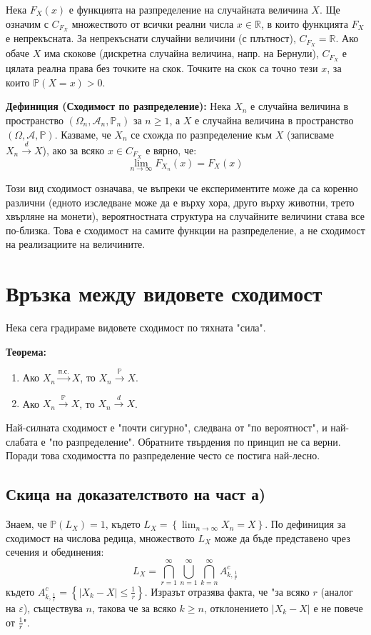\documentclass{article}
\begin{document}
Нека $F_X(x)$ е функцията на разпределение на случайната величина $X$. Ще означим с $C_{F_X}$ множеството от всички реални числа $x \in \mathbb{R}$, в които функцията $F_X$ е непрекъсната. За непрекъснати случайни величини (с плътност), $C_{F_X} = \mathbb{R}$. Ако обаче $X$ има скокове (дискретна случайна величина, напр. на Бернули), $C_{F_X}$ е цялата реална права без точките на скок. Точките на скок са точно тези $x$, за които $\mathbb{P}(X = x) > 0$.

\textbf{Дефиниция (Сходимост по разпределение):} Нека $X_n$ е случайна величина в пространство $(\Omega_n, \mathcal{A}_n, \mathbb{P}_n)$ за $n \ge 1$, а $X$ е случайна величина в пространство $(\Omega, \mathcal{A}, \mathbb{P})$. Казваме, че $X_n$ се схожда по разпределение към $X$ (записваме $X_n \xrightarrow{d} X$), ако за всяко $x \in C_{F_X}$ е вярно, че:
\[
\lim_{n \to \infty} F_{X_n}(x) = F_X(x)
\]

Този вид сходимост означава, че въпреки че експериментите може да са коренно различни (едното изследване може да е върху хора, друго върху животни, трето хвърляне на монети), вероятностната структура на случайните величини става все по-близка. Това е сходимост на самите функции на разпределение, а не сходимост на реализациите на величините.

\section{Връзка между видовете сходимост}

Нека сега градираме видовете сходимост по тяхната "сила".

\textbf{Теорема:}
\begin{enumerate}
    \item[а)] Ако $X_n \xrightarrow{\text{п.с.}} X$, то $X_n \xrightarrow{\mathbb{P}} X$.
    \item[б)] Ако $X_n \xrightarrow{\mathbb{P}} X$, то $X_n \xrightarrow{d} X$.
\end{enumerate}

Най-силната сходимост е "почти сигурно", следвана от "по вероятност", и най-слабата е "по разпределение". Обратните твърдения по принцип не са верни. Поради това сходимостта по разпределение често се постига най-лесно.

\subsection{Скица на доказателството на част а)}
Знаем, че $\mathbb{P}(L_X) = 1$, където $L_X = \left\{ \lim_{n\to\infty} X_n = X \right\}$. По дефиниция за сходимост на числова редица, множеството $L_X$ може да бъде представено чрез сечения и обединения:
\[
L_X = \bigcap_{r=1}^{\infty} \bigcup_{n=1}^{\infty} \bigcap_{k=n}^{\infty} A_{k, \frac{1}{r}}^{c}
\]
където $A_{k, \frac{1}{r}}^{c} = \left\{ |X_k - X| \le \frac{1}{r} \right\}$. Изразът отразява факта, че "за всяко $r$ (аналог на $\varepsilon$), съществува $n$, такова че за всяко $k \ge n$, отклонението $|X_k - X|$ е не повече от $\frac{1}{r}$".
\end{document}
